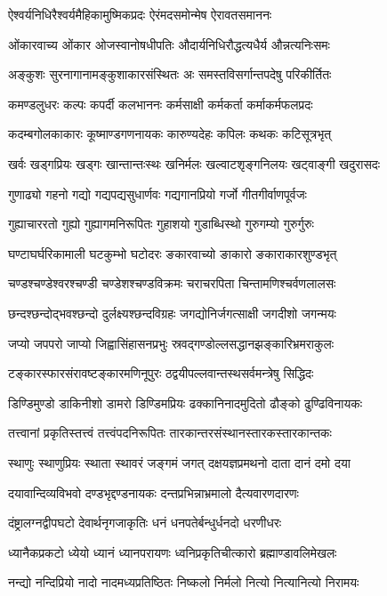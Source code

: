 \twolineshloka
{ऐश्वर्यनिधिरैश्वर्यमैहिकामुष्मिकप्रदः}
{ऐरंमदसमोन्मेष ऐरावतसमाननः}

\twolineshloka
{ओंकारवाच्य ओंकार ओजस्वानोषधीपतिः}
{औदार्यनिधिरौद्धत्यधैर्य औन्नत्यनिःसमः}

\twolineshloka
{अङ्कुशः सुरनागानामङ्कुशाकारसंस्थितः}
{अः समस्तविसर्गान्तपदेषु परिकीर्तितः}

\twolineshloka
{कमण्डलुधरः कल्पः कपर्दी कलभाननः}
{कर्मसाक्षी कर्मकर्ता कर्माकर्मफलप्रदः}

\twolineshloka
{कदम्बगोलकाकारः कूष्माण्डगणनायकः}
{कारुण्यदेहः कपिलः कथकः कटिसूत्रभृत्}

\twolineshloka
{खर्वः खड्गप्रियः खड्गः खान्तान्तःस्थः खनिर्मलः}
{खल्वाटशृङ्गनिलयः खट्वाङ्गी खदुरासदः}

\twolineshloka
{गुणाढ्यो गहनो गद्यो गद्यपद्यसुधार्णवः}
{गद्यगानप्रियो गर्जो गीतगीर्वाणपूर्वजः}

\twolineshloka
{गुह्याचाररतो गुह्यो गुह्यागमनिरूपितः}
{गुहाशयो गुडाब्धिस्थो गुरुगम्यो गुरुर्गुरुः}

\twolineshloka
{घण्टाघर्घरिकामाली घटकुम्भो घटोदरः}
{ङकारवाच्यो ङाकारो ङकाराकारशुण्डभृत्}

\twolineshloka
{चण्डश्चण्डेश्वरश्चण्डी चण्डेशश्चण्डविक्रमः}
{चराचरपिता चिन्तामणिश्चर्वणलालसः}

\twolineshloka
{छन्दश्छन्दोद्भवश्छन्दो दुर्लक्ष्यश्छन्दविग्रहः}
{जगद्योनिर्जगत्साक्षी जगदीशो जगन्मयः}

\twolineshloka
{जप्यो जपपरो जाप्यो जिह्वासिंहासनप्रभुः}
{स्रवद्गण्डोल्लसद्धानझङ्कारिभ्रमराकुलः}

\twolineshloka
{टङ्कारस्फारसंरावष्टङ्कारमणिनूपुरः}
{ठद्वयीपल्लवान्तस्थसर्वमन्त्रेषु सिद्धिदः}

\twolineshloka
{डिण्डिमुण्डो डाकिनीशो डामरो डिण्डिमप्रियः}
{ढक्कानिनादमुदितो ढौङ्को ढुण्ढिविनायकः}

\twolineshloka
{तत्त्वानां प्रकृतिस्तत्त्वं तत्त्वंपदनिरूपितः}
{तारकान्तरसंस्थानस्तारकस्तारकान्तकः}

\twolineshloka
{स्थाणुः स्थाणुप्रियः स्थाता स्थावरं जङ्गमं जगत्}
{दक्षयज्ञप्रमथनो दाता दानं दमो दया}

\twolineshloka
{दयावान्दिव्यविभवो दण्डभृद्दण्डनायकः}
{दन्तप्रभिन्नाभ्रमालो दैत्यवारणदारणः}

\twolineshloka
{दंष्ट्रालग्नद्वीपघटो देवार्थनृगजाकृतिः}
{धनं धनपतेर्बन्धुर्धनदो धरणीधरः}

\twolineshloka
{ध्यानैकप्रकटो ध्येयो ध्यानं ध्यानपरायणः}
{ध्वनिप्रकृतिचीत्कारो ब्रह्माण्डावलिमेखलः}

\twolineshloka
{नन्द्यो नन्दिप्रियो नादो नादमध्यप्रतिष्ठितः}
{निष्कलो निर्मलो नित्यो नित्यानित्यो निरामयः}

